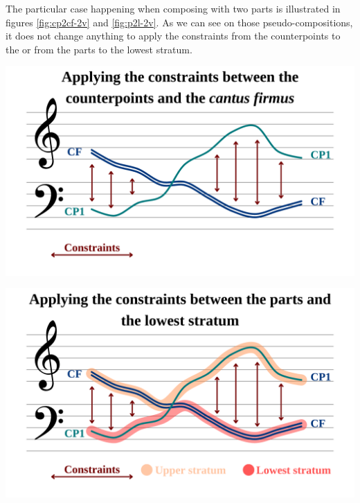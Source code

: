 The particular case happening when composing with two parts is illustrated in figures \ref{fig:cp2cf-2v} and \ref{fig:p2l-2v}. As we can see on those pseudo-compositions, it does not change anything to apply the constraints from the counterpoints to the \cf or from the parts to the lowest stratum.

\vspace{.5cm}
\begin{minipage}{0.46\textwidth}
    \centering
    \includegraphics[width=\textwidth]{Images/cp2cf-2v.png}
    \label{fig:cp2cf-2v}
    \end{minipage}
    \hfill
    \begin{minipage}{0.46\textwidth}
      \centering
      \includegraphics[width=\textwidth]{Images/p2l-2v.png}
      \label{fig:p2l-2v}
\end{minipage}
\vspace{.5cm}

